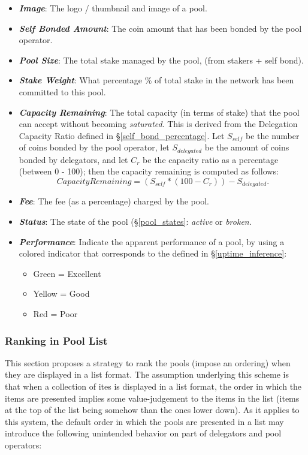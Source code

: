 \begin{itemize}
    \item \textit{\textbf{Image}}: The logo / thumbnail and image of a pool.
    \item \textit{\textbf{Self Bonded Amount}}: The coin amount that has been bonded by the pool operator.
    \item \textit{\textbf{Pool Size}}: The total stake managed by the pool, (from stakers + self bond).
    \item \textit{\textbf{Stake Weight}}: What percentage \% of total stake in the network has been committed to this pool.
    \item \textit{\textbf{Capacity Remaining}}: The total capacity (in terms of stake) that the pool can accept without becoming \textit{saturated}. This is derived from the Delegation Capacity Ratio defined in \S\ref{self_bond_percentage}. Let $S_{self}$ be the number of coins bonded by the pool operator, let $S_{delegated}$ be the amount of coins bonded by delegators, and let $C_r$ be the capacity ratio as a percentage (between 0 - 100); then the capacity remaining  is computed as follows: 
    $$ Capacity Remaining = (S_{self} * (100 - C_r)) - S_{delegated}.$$
    \item \textit{\textbf{Fee}}: The fee (as a percentage) charged by the pool.
    \item \textit{\textbf{Status}}: The state of the pool (\S\ref{pool_states}: \textit{active} or \textit{broken}. 
    \item \textit{\textbf{Performance}}: Indicate the apparent performance of a pool, by using a colored indicator that corresponds to the  defined in \S\ref{uptime_inference}: 
    \begin{itemize}[nosep, label=--]
        \item Green = Excellent
        \item Yellow = Good
        \item Red = Poor
    \end{itemize}
\end{itemize}

\subsubsection{Ranking in Pool List}

This section proposes a strategy to rank the pools (impose an ordering) when they are displayed in a list format. The assumption underlying this scheme is that when a collection of ites is displayed in a list format, the order in which the items are presented implies some value-judgement to the items in the list (items at the top of the list being somehow  than the ones lower down). As it applies to this system, the default order in which the pools are presented in a list may introduce the following unintended behavior on part of delegators and pool operators:   

